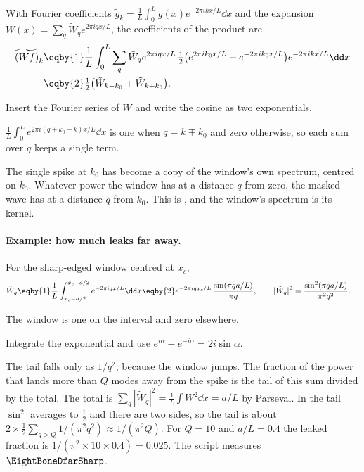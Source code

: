 With Fourier coefficients $\tilde g_k=\frac1L\int_0^L g(x)e^{-2\pi ikx/L}\dd x$ and the expansion
$W(x)=\sum_q\tilde W_qe^{2\pi iqx/L}$, the coefficients of the product are
\begin{align}
  \widetilde{(Wf)}_k
  &\eqby{1}\frac1L\int_0^L\sum_q\tilde W_qe^{2\pi iqx/L}\,
     \tfrac12\bigl(e^{2\pi ik_0x/L}+e^{-2\pi ik_0x/L}\bigr)e^{-2\pi ikx/L}\dd x \nonumber\\
  &\eqby{2}\tfrac12\bigl(\tilde W_{k-k_0}+\tilde W_{k+k_0}\bigr).
  \label{8b:eq:leak-1d}
\end{align}
\begin{explain}
  \item Insert the Fourier series of $W$ and write the cosine as two exponentials.
  \item $\frac1L\int_0^Le^{2\pi i(q\pm k_0-k)x/L}\dd x$ is one when $q=k\mp k_0$ and zero otherwise,
        so each sum over $q$ keeps a single term.
\end{explain}
The single spike at $k_0$ has become a copy of the window's own spectrum, centred on $k_0$.
Whatever power the window has at a distance $q$ from zero, the masked wave has at a distance
$q$ from $k_0$. This is , and the window's spectrum is its kernel.

\paragraph{Example: how much leaks far away.}
For the sharp-edged window centred at $x_c$,
\begin{align}
  \tilde W_q
  &\eqby{1}\frac1L\int_{x_c-a/2}^{x_c+a/2}e^{-2\pi iqx/L}\dd x
   \eqby{2}e^{-2\pi iqx_c/L}\,\frac{\sin(\pi qa/L)}{\pi q},
  \qquad
  |\tilde W_q|^2=\frac{\sin^2(\pi qa/L)}{\pi^2q^2}.
  \label{8b:eq:tophat-1d}
\end{align}
\begin{explain}
  \item The window is one on the interval and zero elsewhere.
  \item Integrate the exponential and use $e^{i\alpha}-e^{-i\alpha}=2i\sin\alpha$.
\end{explain}
The tail falls only as $1/q^2$, because the window jumps. The fraction of the power that lands
more than $Q$ modes away from the spike is the tail of this sum divided by the total. The total is
$\sum_q|\tilde W_q|^2=\frac1L\int W^2\dd x=a/L$ by Parseval. In the tail $\sin^2$ averages to
$\frac12$ and there are two sides, so the tail is about $2\times\frac12\sum_{q>Q}1/(\pi^2q^2)
\approx1/(\pi^2Q)$. For $Q=10$ and $a/L=0.4$ the leaked fraction is
$1/(\pi^2\times10\times0.4)=0.025$. The script  measures
$\EightBoneDfarSharp$.

